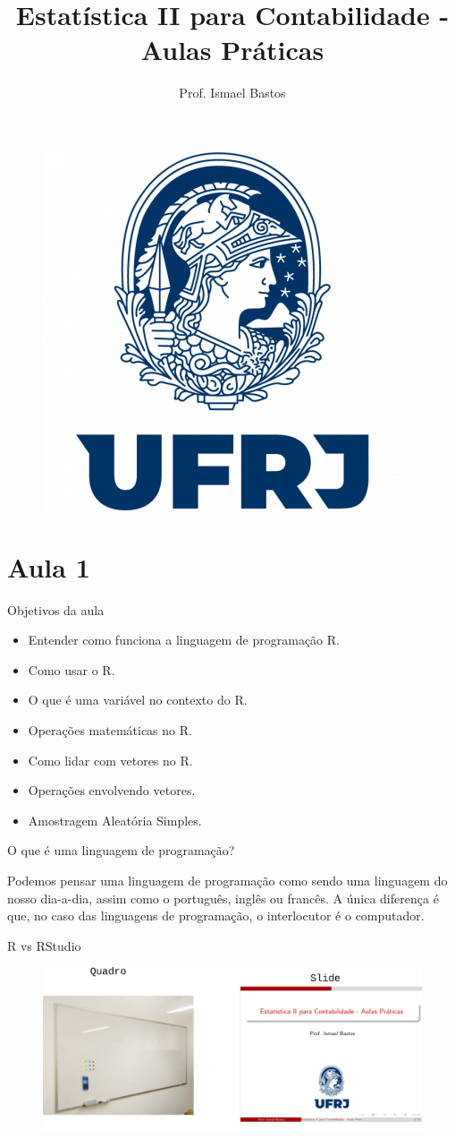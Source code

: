 \documentclass{beamer}
\title{Estatística II para Contabilidade - Aulas Práticas}
\author{ Prof. Ismael Bastos}
\date{}
\begin{document}
\begin{frame}
    \titlepage
    \begin{figure}[htpb]
        \begin{center}
            \includegraphics[width=0.25\linewidth]{figures/arbalest.png}
        \end{center}
    \end{figure}
\end{frame}


\section{Aula 1}
\begin{frame}{Objetivos da aula}
  \begin{itemize}
    \item Entender como funciona a linguagem de programação R.
    \item Como usar o R.
    \item O que é uma variável no contexto do R.
    \item Operações matemáticas no R. 
    \item Como lidar com vetores no R. 
    \item Operações envolvendo vetores. 
    \item Amostragem Aleatória Simples. 
  \end{itemize}
\end{frame}
\begin{frame}{O que é uma linguagem de programação?}
  
  Podemos pensar uma linguagem de programação como sendo uma linguagem do nosso dia-a-dia,
  assim como o português, inglês ou francês. A única diferença é que, no caso das linguagens de programação, 
  o interlocutor é o computador. 

\end{frame}

\begin{frame}{R vs RStudio}
  \begin{figure}
    \begin{center}
            \includegraphics[scale=0.25]{figures/quadro_vs_slide.png}
        \end{center}
  \end{figure}
\end{frame}
\end{document}
